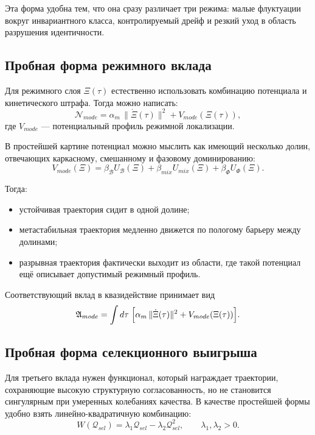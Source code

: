 \documentclass[12pt,a4paper]{article}
\begin{document}
Эта форма удобна тем, что она сразу различает три режима: малые флуктуации вокруг инвариантного класса, контролируемый дрейф и резкий уход в область разрушения идентичности.

\subsection{Пробная форма режимного вклада}

Для режимного слоя \(\Xi(\tau)\) естественно использовать комбинацию потенциала и кинетического штрафа. Тогда можно написать:
\begin{equation}
\mathcal{N}_{mode}=\alpha_{m}\,\|\dot{\Xi}(\tau)\|^2 + V_{mode}(\Xi(\tau)),
\end{equation}
где \(V_{mode}\) --- потенциальный профиль режимной локализации.

В простейшей картине потенциал можно мыслить как имеющий несколько долин, отвечающих каркасному, смешанному и фазовому доминированию:
\begin{equation}
V_{mode}(\Xi)=\beta_{\mathcal{B}}U_{\mathcal{B}}(\Xi)+\beta_{mix}U_{mix}(\Xi)+\beta_{\Phi}U_{\Phi}(\Xi).
\end{equation}

Тогда:
\begin{itemize}
    \item устойчивая траектория сидит в одной долине;
    \item метастабильная траектория медленно движется по пологому барьеру между долинами;
    \item разрывная траектория фактически выходит из области, где такой потенциал ещё описывает допустимый режимный профиль.
\end{itemize}

Соответствующий вклад в квазидействие принимает вид
\begin{equation}
\mathfrak{A}_{mode}=\int d\tau\;\Bigl[\alpha_{m}\,\|\dot{\Xi}(\tau)\|^2 + V_{mode}(\Xi(\tau))\Bigr].
\end{equation}

\subsection{Пробная форма селекционного выигрыша}

Для третьего вклада нужен функционал, который награждает траектории, сохраняющие высокую структурную согласованность, но не становится сингулярным при умеренных колебаниях качества. В качестве простейшей формы удобно взять линейно-квадратичную комбинацию:
\begin{equation}
W(\mathcal{Q}_{sel})=\lambda_1\mathcal{Q}_{sel}-\lambda_2\mathcal{Q}_{sel}^2,
\qquad
\lambda_1,\lambda_2>0.
\end{equation}
\end{document}
